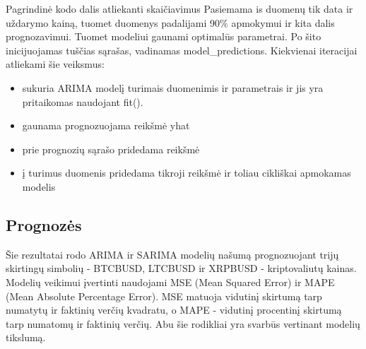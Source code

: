 \documentclass{VUMIFInfKursinis}
\begin{document}
Pagrindinė kodo dalis atliekanti skaičiavimus
Pasiemama is duomenų tik data ir uždarymo kainą, tuomet duomenys padalijami 90\% apmokymui ir kita dalis prognozavimui. Tuomet modeliui gaunami 
optimalūs parametrai. Po šito inicijuojamas tuščias sąrašas, vadinamas model\_predictions. Kiekvienai iteracijai atliekami šie veiksmus:

\begin{itemize}
  \item sukuria ARIMA modelį turimais duomenimis ir parametrais ir jis yra pritaikomas naudojant fit().
  \item gaunama prognozuojama reikšmė yhat
  \item prie prognozių sąrašo pridedama reikšmė
  \item į turimus duomenis pridedama tikroji reikšmė ir toliau cikliškai apmokamas modelis
\end{itemize}

\subsection{Prognozės}

Šie rezultatai rodo ARIMA ir SARIMA modelių našumą prognozuojant trijų skirtingų simbolių - BTCBUSD, LTCBUSD ir XRPBUSD - kriptovaliutų kainas.
Modelių veikimui įvertinti naudojami MSE (Mean Squared Error) ir MAPE (Mean Absolute Percentage Error). 
MSE matuoja vidutinį skirtumą tarp numatytų ir faktinių verčių kvadratu, o MAPE - vidutinį procentinį skirtumą tarp numatomų ir faktinių verčių. 
Abu šie rodikliai yra svarbūs vertinant modelių tikslumą.
\end{document}
